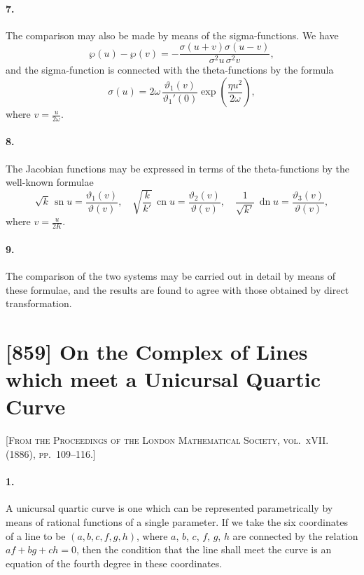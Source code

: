 \documentclass[11pt,a4paper]{book}
\begin{document}
\paragraph{7.} The comparison may also be made by means of the sigma-functions. We have
\[
\wp(u) - \wp(v) = -\frac{\sigma(u + v)\sigma(u - v)}{\sigma^{2}u\,\sigma^{2}v},
\]
and the sigma-function is connected with the theta-functions by the formula
\[
\sigma(u) = 2\omega\,\frac{\vartheta_{1}(v)}{\vartheta_{1}'(0)}\exp\left(\frac{\eta u^{2}}{2\omega}\right),
\]
where $v = \frac{u}{2\omega}$.

\paragraph{8.} The Jacobian functions may be expressed in terms of the theta-functions by the well-known formulae
\[
\sqrt{k}\,\operatorname{sn} u = \frac{\vartheta_{1}(v)}{\vartheta(v)}, \quad
\sqrt{\frac{k}{k'}}\,\operatorname{cn} u = \frac{\vartheta_{2}(v)}{\vartheta(v)}, \quad
\frac{1}{\sqrt{k'}}\,\operatorname{dn} u = \frac{\vartheta_{3}(v)}{\vartheta(v)},
\]
where $v = \frac{u}{2K}$.

\paragraph{9.} The comparison of the two systems may be carried out in detail by means of these formulae, and the results are found to agree with those obtained by direct transformation.

\newpage
\section*{[859] On the Complex of Lines which meet a Unicursal Quartic Curve}

\noindent\textsc{[From the Proceedings of the London Mathematical Society, vol.~xVII. (1886), pp.~109--116.]}

\smallskip

\paragraph{1.} A unicursal quartic curve is one which can be represented parametrically by means of rational functions of a single parameter. If we take the six coordinates of a line to be $(a, b, c, f, g, h)$, where $a$, $b$, $c$, $f$, $g$, $h$ are connected by the relation $af + bg + ch = 0$, then the condition that the line shall meet the curve is an equation of the fourth degree in these coordinates.
\end{document}
